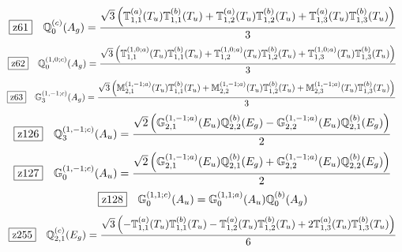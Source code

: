 \documentclass[fleqn,10pt,landscape]{jsarticle}
\begin{document}
\begin{dmath*}
\hspace*{3mm}\fbox{z61}\quad \mathbb{Q}_{0}^{(c)}(A_{g})=\frac{\sqrt{3} \left(\mathbb{T}_{1,1}^{(a)}(T_{u}) \mathbb{T}_{1,1}^{(b)}(T_{u}) + \mathbb{T}_{1,2}^{(a)}(T_{u}) \mathbb{T}_{1,2}^{(b)}(T_{u}) + \mathbb{T}_{1,3}^{(a)}(T_{u}) \mathbb{T}_{1,3}^{(b)}(T_{u})\right)}{3}
\end{dmath*}
\begin{dmath*}
\hspace*{3mm}\fbox{z62}\quad \mathbb{Q}_{0}^{(1,0;c)}(A_{g})=\frac{\sqrt{3} \left(\mathbb{T}_{1,1}^{(1,0;a)}(T_{u}) \mathbb{T}_{1,1}^{(b)}(T_{u}) + \mathbb{T}_{1,2}^{(1,0;a)}(T_{u}) \mathbb{T}_{1,2}^{(b)}(T_{u}) + \mathbb{T}_{1,3}^{(1,0;a)}(T_{u}) \mathbb{T}_{1,3}^{(b)}(T_{u})\right)}{3}
\end{dmath*}
\begin{dmath*}
\hspace*{3mm}\fbox{z63}\quad \mathbb{G}_{3}^{(1,-1;c)}(A_{g})=\frac{\sqrt{3} \left(\mathbb{M}_{2,1}^{(1,-1;a)}(T_{u}) \mathbb{T}_{1,1}^{(b)}(T_{u}) + \mathbb{M}_{2,2}^{(1,-1;a)}(T_{u}) \mathbb{T}_{1,2}^{(b)}(T_{u}) + \mathbb{M}_{2,3}^{(1,-1;a)}(T_{u}) \mathbb{T}_{1,3}^{(b)}(T_{u})\right)}{3}
\end{dmath*}
\begin{dmath*}
\hspace*{3mm}\fbox{z126}\quad \mathbb{Q}_{3}^{(1,-1;c)}(A_{u})=\frac{\sqrt{2} \left(\mathbb{G}_{2,1}^{(1,-1;a)}(E_{u}) \mathbb{Q}_{2,2}^{(b)}(E_{g}) - \mathbb{G}_{2,2}^{(1,-1;a)}(E_{u}) \mathbb{Q}_{2,1}^{(b)}(E_{g})\right)}{2}
\end{dmath*}
\begin{dmath*}
\hspace*{3mm}\fbox{z127}\quad \mathbb{G}_{0}^{(1,-1;c)}(A_{u})=\frac{\sqrt{2} \left(\mathbb{G}_{2,1}^{(1,-1;a)}(E_{u}) \mathbb{Q}_{2,1}^{(b)}(E_{g}) + \mathbb{G}_{2,2}^{(1,-1;a)}(E_{u}) \mathbb{Q}_{2,2}^{(b)}(E_{g})\right)}{2}
\end{dmath*}
\begin{dmath*}
\hspace*{3mm}\fbox{z128}\quad \mathbb{G}_{0}^{(1,1;c)}(A_{u})=\mathbb{G}_{0}^{(1,1;a)}(A_{u}) \mathbb{Q}_{0}^{(b)}(A_{g})
\end{dmath*}
\begin{dmath*}
\hspace*{3mm}\fbox{z255}\quad \mathbb{Q}_{2,1}^{(c)}(E_{g})=\frac{\sqrt{3} \left(- \mathbb{T}_{1,1}^{(a)}(T_{u}) \mathbb{T}_{1,1}^{(b)}(T_{u}) - \mathbb{T}_{1,2}^{(a)}(T_{u}) \mathbb{T}_{1,2}^{(b)}(T_{u}) + 2 \mathbb{T}_{1,3}^{(a)}(T_{u}) \mathbb{T}_{1,3}^{(b)}(T_{u})\right)}{6}
\end{dmath*}
\end{document}
